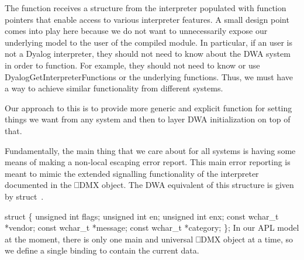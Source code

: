 \documentclass{article}%
\begin{document}
The function receives a structure from the interpreter
populated with function pointers
that enable access to various interpreter features.
A small design point comes into play here
because we do not want to unnecessarily expose our underlying model
to the user of the compiled module.
In particular, if an user is not a Dyalog interpreter,
they should not need to know about the DWA system in order to 
function.
For example, they should not need 
to know or use {\Tt{}DyalogGetInterpreterFunctions\nwendquote}
or the underlying functions.
Thus, we must have a way
to achieve similar functionality from different systems.

Our approach to this is to provide more generic
and explicit function for setting things
we want from any system and then to layer DWA initialization 
on top of that.

Fundamentally, the main thing that we care about
for all systems is having some means of making
a non-local escaping error report.
This main error reporting is meant to mimic
the extended signalling functionality
of the interpreter documented in the {\Tt{}⎕DMX\nwendquote}
object.
The DWA equivalent of this structure is given
by {\Tt{}struct\ \nwendquote}.

\nwenddocs{}\endmoddef\nwstartdeflinemarkup{}\nwenddeflinemarkup
struct  \{
        unsigned int flags;
        unsigned int en;
        unsigned int enx;
        const wchar_t *vendor;
        const wchar_t *message;
        const wchar_t *category;
\};
\eatline
{}\nwendcode{}\nwdocspar
In our APL model at the moment,
there is only one main and universal {\Tt{}⎕DMX\nwendquote} object
at a time, so we define a single {\Tt{}\nwendquote} binding
to contain the current data.
\end{document}
